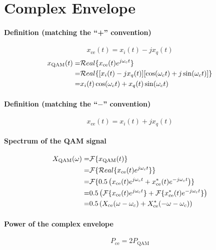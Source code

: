 \section*{Complex Envelope}

\paragraph{Definition (matching the ``+'' convention)}
\[
x_{\textrm{ce}}(t) = x_i(t) - j x_q(t)
\]
\begin{align}
x_{\textrm{QAM}}(t) = & {\mathcal Real \{ x_{\textrm{ce}}(t) e^{j {\omega}_c t} \}} \notag \\
 = & {\mathcal Real \{ [x_i(t)- jx_q(t)] [\cos({\omega}_c t)+j\sin({\omega}_c t)]\}} \notag \\
 = & x_i(t) \cos({\omega}_c t) + x_q(t) \sin({\omega}_c t)
\label{eq:qam_complex}
\end{align}

\paragraph{Definition (matching the ``$-$'' convention)}
\begin{equation}
x_{\textrm{ce}}(t) = x_i(t) + j x_q(t)
\label{eq:complex_envelope}
\end{equation}

\paragraph{Spectrum of the QAM signal}
\begin{align}
X_{\textrm{QAM}}({\omega}) = & {\cal F} \{ x_{\textrm{QAM}}(t) \}  \notag \\
 = & {\cal F} \{ {\mathcal Real \{ x_{\textrm{ce}}(t) e^{j {\omega}_c t} \}} \} \notag \\
= & {\cal F} \{ 0.5 \left( x_{\textrm{ce}}(t) e^{j {\omega}_c t} + x_{\textrm{ce}}^*(t) e^{-j {\omega}_c t} \right)  \} \notag \\
= & 0.5 \left( {\cal F} \{ x_{\textrm{ce}}(t) e^{j {\omega}_c t} \} + {\cal F} \{ x_{\textrm{ce}}^*(t) e^{-j {\omega}_c t} \} \right) \notag \\
= & 0.5 \left( X_{\textrm{ce}}({\omega} - {\omega}_c) +  X_{\textrm{ce}}^*(-{\omega} - {\omega}_c) \right)
\label{eq:qam_complex_in_freq_domain}
\end{align}

\paragraph{Power of the complex envelope}
\[
P_{\textrm{ce}} = 2 P_{\textrm{QAM}}
\]

